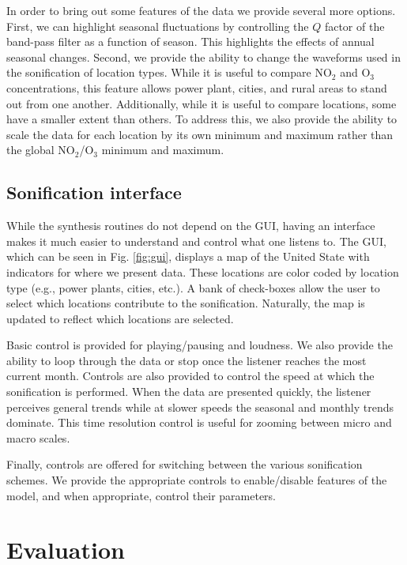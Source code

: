 \documentclass[a4paper,10pt,oneside]{article}
\newcommand{\ce}[1]{$\mathrm{#1}$}
\begin{document}
\begin{sloppy}
In order to bring out some features of the data we provide several more options. First, we can highlight seasonal fluctuations by controlling the $Q$ factor of the band-pass filter as a function of season. This highlights the effects of annual seasonal changes. Second, we provide the ability to change the waveforms used in the sonification of location types. While it is useful to compare \ce{NO_2} and \ce{O_3} concentrations, this feature allows power plant, cities, and rural areas to stand out from one another. Additionally, while it is useful to compare locations, some have a smaller extent than others. To address this, we also provide the ability to scale the data for each location by its own minimum and maximum rather than the global \ce{NO_2}/\ce{O_3} minimum and maximum.  


\subsection{Sonification interface}

While the synthesis routines do not depend on the GUI, having an interface makes it much easier to understand and control what one listens to. The GUI, which can be seen in Fig. \ref{fig:gui}, displays a map of the United State with indicators for where we present data.  These locations are color coded by location type (e.g., power plants, cities, etc.). A bank of check-boxes allow the user to select which locations contribute to the sonification. Naturally, the map is updated to reflect which locations are selected.  


Basic control is provided for playing/pausing and loudness. We also provide the ability to loop through the data or stop once the listener reaches the most current month.  Controls are also provided to control the speed at which the sonification is performed.  When the data are presented quickly, the listener perceives general trends while at slower speeds the seasonal and monthly trends dominate.  This time resolution control is useful for zooming between micro and macro scales.  

Finally, controls are offered for switching between the various sonification schemes. We provide the appropriate controls to enable/disable features of the model, and when appropriate, control their parameters.  

\section{Evaluation}


\end{sloppy}
\end{document}

